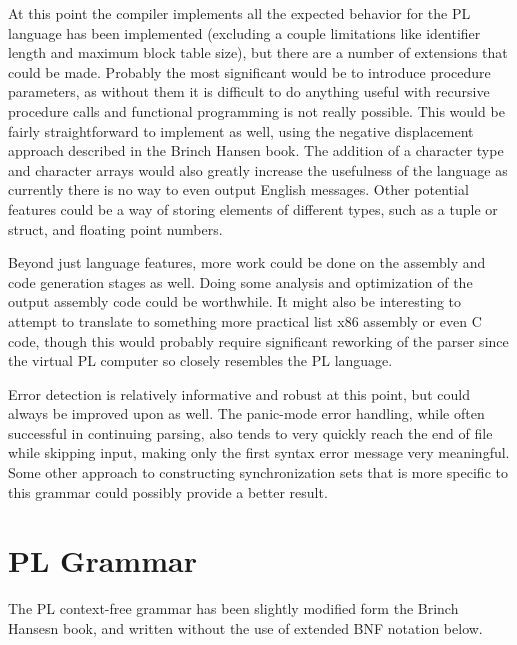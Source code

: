\documentclass{article}
\begin{document}
        At this point the compiler implements all the expected behavior for the PL language has been implemented (excluding a couple limitations like identifier length and maximum block table size), but there are a number of extensions that could be made. Probably the most significant would be to introduce procedure parameters, as without them it is difficult to do anything useful with recursive procedure calls and functional programming is not really possible. This would be fairly straightforward to implement as well, using the negative displacement approach described in the Brinch Hansen book. The addition of a character type and character arrays would also greatly increase the usefulness of the language as currently there is no way to even output English messages. Other potential features could be a way of storing elements of different types, such as a tuple or struct, and floating point numbers. 

        Beyond just language features, more work could be done on the assembly and code generation stages as well. Doing some analysis and optimization of the output assembly code could be worthwhile. It might also be interesting to attempt to translate to something more practical list x86 assembly or even C code, though this would probably require significant reworking of the parser since the virtual PL computer so closely resembles the PL language.

        Error detection is relatively informative and robust at this point, but could always be improved upon as well. The panic-mode error handling, while often successful in continuing parsing, also tends to very quickly reach the end of file while skipping input, making only the first syntax error message very meaningful. Some other approach to constructing synchronization sets that is more specific to this grammar could possibly provide a better result.


    \pagebreak
    \section{PL Grammar}
    The PL context-free grammar has been slightly modified form the Brinch Hansesn book, and written without the use of extended BNF notation below.
\end{document}
